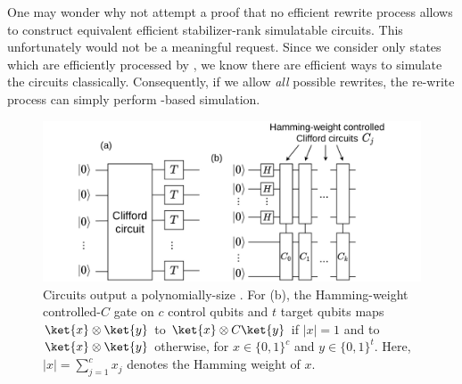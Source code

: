 One may wonder why not attempt a proof that no efficient rewrite process allows to construct equivalent efficient stabilizer-rank simulatable circuits.
This unfortunately would not be a meaningful request.
Since we consider only states which are efficiently processed by \limdd, we know there are efficient ways to simulate the circuits classically.
Consequently, if we allow \emph{all} possible rewrites, the re-write process can simply perform  \limdd-based simulation.





\begin{figure}
	\includegraphics[width=1.0\textwidth]{pics/t-gate-tower.pdf}
	\caption{
		Circuits output a polynomially-size \limdd.
		For (b), the Hamming-weight controlled-$C$ gate on $c$ control qubits and $t$ target qubits maps $\ket{x}\otimes \ket{y}$ to $\ket{x}\otimes C\ket{y}$ if $|x| = 1$ and to $\ket{x}\otimes\ket{y}$ otherwise, for $x\in \{0, 1\}^c$ and $y\in \{0, 1\}^t$.
		Here, $|x| = \sum_{j=1}^c x_j$ denotes the Hamming weight of $x$.
		\label{fig:stabilizer-rank-hard}
	}
\end{figure}

